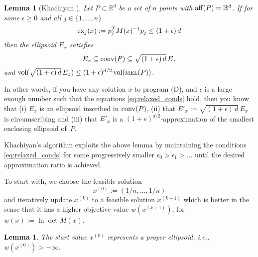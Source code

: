 \documentclass[a4paper,twocolumn]{article}
\newcommand{\R}{\ensuremath{\mathbb{R}}}
\newcommand{\vol}{\ensuremath{\mathop{\rm vol}\nolimits}}
\newcommand{\aff}{\ensuremath{\mathop{\rm aff}\nolimits}}
\newcommand{\conv}{\ensuremath{\mathop{\rm conv}\nolimits}}
\newcommand{\excess}{\ensuremath{\mathop{\rm ex}\nolimits}}
\newcommand{\MEL}{\ensuremath{\mathop{\textnormal{\textsc{mel}}}\nolimits}}
\newtheorem{lemma}[theorem]{Lemma}
\begin{document}
\begin{lemma}[Khachiyan \cite{k-rprnmc-96}]
  \label{thm:rounding}
  Let $P\subset\R^d$ be a set of $n$ points with $\aff(P)=\R^d$.  If
  for some $\epsilon\ge 0$ and all $j\in\{1,\ldots,n\}$
  \begin{equation}
    \label{eq:relaxed_conds}
    \excess_j(x):= p_j^T M(x)^{-1} p_j \le (1+\epsilon)\,d
  \end{equation}
  then the ellipsoid $E_x$ satisfies 
  \begin{equation}
    \label{eq:rounding}
    E_x \subseteq \conv(P) \subseteq \sqrt{(1+\epsilon)\,d}\,E_x
  \end{equation}
  and $\vol(\sqrt{(1+\epsilon)\,d}\,E_x) \le (1+\epsilon)^{d/2}
  \vol(\MEL(P))$.
\end{lemma}
%
In other words, if you have any solution $x$ to program (D), and
$\epsilon$ is a large enough number such that the equations
\eqref{eq:relaxed_conds} hold, then you know that (i) $E_x$ is an
ellipsoid inscribed in $\conv(P)$, (ii) that $E'_x:=
\sqrt{(1+\epsilon)\,d}\,E_x$ is circumscribing and (iii) that $E'_x$
is a $(1+e)^{d/2}$-approximation of the smallest enclosing ellipsoid
of~$P$.

Khachiyan's algorithm exploits the above lemma by maintaining the
conditions \eqref{eq:relaxed_conds} for some progressively smaller
$\epsilon_0>\epsilon_1>\ldots$ until the desired approximation ratio
is achieved.

To start with, we choose the feasible solution
\begin{equation}
  \label{eq:feasible}
  x^{(0)} := (1/n,\ldots,1/n)
\end{equation}
and iteratively update $x^{(k)}$ to a feasible solution $x^{(k+1)}$
which is better in the sense that it has a higher objective value %
$w(x^{(k+1)})$, for $w(x):= \ln \det M(x)$.

\begin{lemma}
  \label{lemma:start}
  The start value $x^{(0)}$ represents a proper ellipsoid, i.e.,
  $w(x^{(0)})>-\infty$.
\end{lemma}

\end{document}
